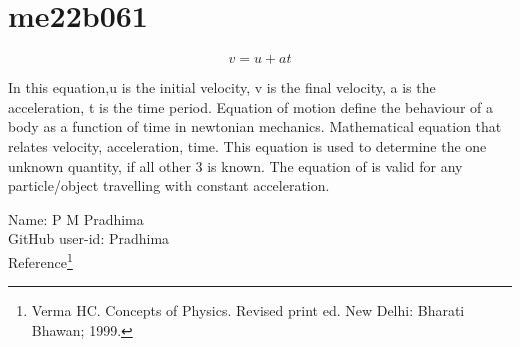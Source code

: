 \section*{me22b061}

\[ v = u + at \]

In this equation,u is the initial velocity, v is the final velocity, a is the acceleration, t is the time period.
Equation of motion define the behaviour of a body as a function of time in newtonian mechanics.
Mathematical equation that relates velocity, acceleration, time.
This equation is used to determine the one unknown quantity, if all other 3 is known.
The equation of is valid for any particle/object travelling with constant acceleration.

\vspace{40pt}

Name: P M Pradhima\\

GitHub user-id: Pradhima\\

Reference\footnote{Verma HC. Concepts of Physics. Revised print ed. New Delhi: Bharati Bhawan; 1999.}

